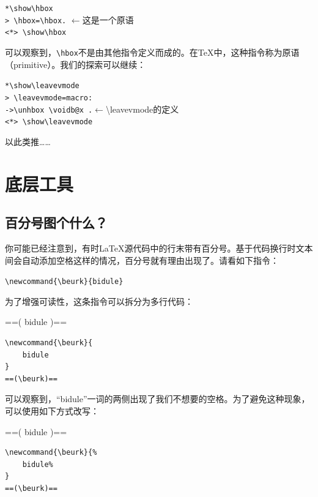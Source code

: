 \begin{dmd}
\verb|*\show\hbox|\\
\verb|> \hbox=\hbox.| \quad $\leftarrow$\textsf{这是一个原语}\\
\verb|<*> \show\hbox|
\end{dmd}

可以观察到，\verb|\hbox|不是由其他指令定义而成的。在\TeX 中，这种指令称为原语（primitive）。我们的探索可以继续：

\begin{dmd}
\verb|*\show\leavevmode|\\
\verb|> \leavevmode=macro:|\\
\verb|->\unhbox \voidb@x .|\quad $\leftarrow$\backslash leavevmode\textsf{的定义}\\
\verb|<*> \show\leavevmode|
\end{dmd}

以此类推……

\section{底层工具}

\subsection{百分号图个什么？}

你可能已经注意到，有时\LaTeX 源代码中的行末带有百分号\dm{\%}。基于代码换行时文本间会自动添加空格这样的情况，百分号就有理由出现了。请看如下指令：

\begin{dmd}
\verb|\newcommand{\beurk}{bidule}|
\end{dmd}

为了增强可读性，这条指令可以拆分为多行代码：

\begin{codelist}[9.1]{
\newcommand{\beurk}{
    bidule
}
==(\beurk)==
}\begin{verbatim}
\newcommand{\beurk}{
    bidule
}
==(\beurk)==
\end{verbatim}
\end{codelist}

可以观察到，“bidule”一词的两侧出现了我们不想要的空格。为了避免这种现象，可以使用如下方式改写：


\begin{codelist}[9.2]{
\newcommand{\beurk}{%
    bidule%
}
==(\beurk)==
}\begin{verbatim}
\newcommand{\beurk}{%
    bidule%
}
==(\beurk)==
\end{verbatim}
\end{codelist}

